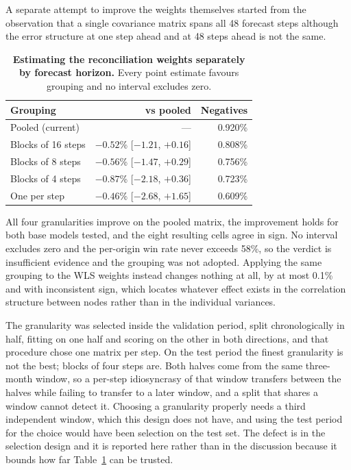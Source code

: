 A separate attempt to improve the weights themselves started from the observation that a
single covariance matrix spans all 48 forecast steps although the error structure at one
step ahead and at 48 steps ahead is not the same.

\begin{table}[htp]
\centering
\begin{tabular}{lrr}
\toprule
{\bf Grouping} & {\bf vs pooled} & {\bf Negatives} \\
\midrule
Pooled (current) & --- & 0.920\% \\
Blocks of 16 steps & $-0.52$\% [$-1.21$, $+0.16$] & 0.808\% \\
Blocks of 8 steps & $-0.56$\% [$-1.47$, $+0.29$] & 0.756\% \\
Blocks of 4 steps & $-0.87$\% [$-2.18$, $+0.36$] & 0.723\% \\
One per step & $-0.46$\% [$-2.68$, $+1.65$] & 0.609\% \\
\bottomrule
\end{tabular}
\caption[Horizon-grouped weights]{\textbf{Estimating the reconciliation weights separately
by forecast horizon.} Every point estimate favours grouping and no interval excludes zero.}
\label{tab:horizgroup}
\end{table}

All four granularities improve on the pooled matrix, the improvement holds for both base
models tested, and the eight resulting cells agree in sign. No interval excludes zero and
the per-origin win rate never exceeds 58\%, so the verdict is insufficient evidence and the
grouping was not adopted. Applying the same grouping to the WLS weights instead changes
nothing at all, by at most 0.1\% and with inconsistent sign, which locates whatever effect
exists in the correlation structure between nodes rather than in the individual variances.

The granularity was selected inside the validation period, split chronologically in half,
fitting on one half and scoring on the other in both directions, and that procedure chose
one matrix per step. On the test period the finest granularity is not the best; blocks of
four steps are. Both halves come from the same three-month window, so a per-step
idiosyncrasy of that window transfers between the halves while failing to transfer to a
later window, and a split that shares a window cannot detect it. Choosing a granularity
properly needs a third independent window, which this design does not have, and using the
test period for the choice would have been selection on the test set. The defect is in the
selection design and it is reported here rather than in the discussion because it bounds how
far Table~\ref{tab:horizgroup} can be trusted.

